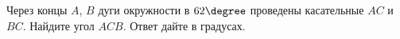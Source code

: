 \begin{ex}
	\begin{condition}
		Через концы \( A \), \( B \)  дуги окружности в \( 62\degree \) проведены касательные \( AC \)  и \( BC \). Найдите угол \( ACB \). Ответ дайте в градусах.
	\end{condition}
\end{ex}